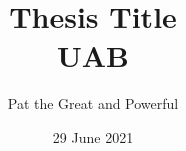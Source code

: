 \title{
{Thesis Title}\\
{UAB}\\
}
\author{Pat the Great and Powerful}
\date{29 June 2021}
\maketitle